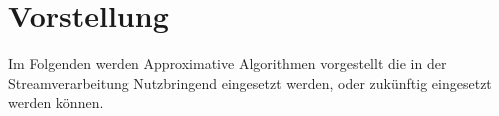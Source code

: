 \section{Vorstellung}
Im Folgenden werden Approximative Algorithmen vorgestellt die in der Streamverarbeitung Nutzbringend eingesetzt werden, oder zukünftig eingesetzt werden können.